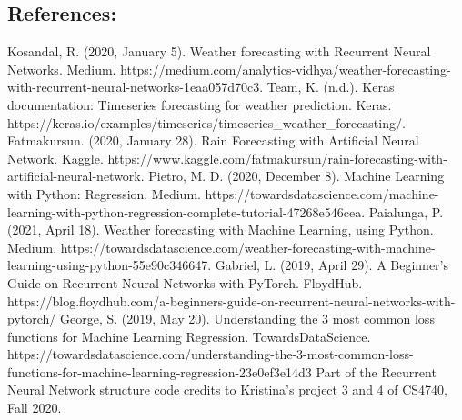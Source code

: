 \documentclass[11pt]{article}
\begin{document}
    \subsection{References:}\label{references}

Kosandal, R. (2020, January 5). Weather forecasting with Recurrent
Neural Networks. Medium.
https://medium.com/analytics-vidhya/weather-forecasting-with-recurrent-neural-networks-1eaa057d70c3.
Team, K. (n.d.). Keras documentation: Timeseries forecasting for weather
prediction. Keras.
https://keras.io/examples/timeseries/timeseries\_weather\_forecasting/.
Fatmakursun. (2020, January 28). Rain Forecasting with Artificial Neural
Network. Kaggle.
https://www.kaggle.com/fatmakursun/rain-forecasting-with-artificial-neural-network.
Pietro, M. D. (2020, December 8). Machine Learning with Python:
Regression. Medium.
https://towardsdatascience.com/machine-learning-with-python-regression-complete-tutorial-47268e546cea.
Paialunga, P. (2021, April 18). Weather forecasting with Machine
Learning, using Python. Medium.
https://towardsdatascience.com/weather-forecasting-with-machine-learning-using-python-55e90c346647.
Gabriel, L. (2019, April 29). A Beginner's Guide on Recurrent Neural
Networks with PyTorch. FloydHub.
https://blog.floydhub.com/a-beginners-guide-on-recurrent-neural-networks-with-pytorch/
George, S. (2019, May 20). Understanding the 3 most common loss
functions for Machine Learning Regression. TowardsDataScience.
https://towardsdatascience.com/understanding-the-3-most-common-loss-functions-for-machine-learning-regression-23e0ef3e14d3
Part of the Recurrent Neural Network structure code credits to
Kristina's project 3 and 4 of CS4740, Fall 2020.


    
    
    
    
\end{document}
